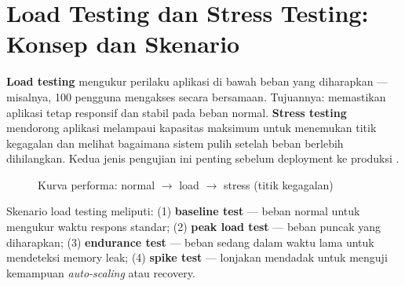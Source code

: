 ﻿\section{Load Testing dan Stress Testing: Konsep dan Skenario}

\textbf{Load testing} mengukur perilaku aplikasi di bawah beban yang diharapkan --- misalnya, 100 pengguna mengakses secara bersamaan. Tujuannya: memastikan aplikasi tetap responsif dan stabil pada beban normal. \textbf{Stress testing} mendorong aplikasi melampaui kapasitas maksimum untuk menemukan titik kegagalan dan melihat bagaimana sistem pulih setelah beban berlebih dihilangkan. Kedua jenis pengujian ini penting sebelum deployment ke produksi \cite{mdnToolsTesting}.

\begin{figure}[H]
\centering
{}
\caption{Kurva performa: normal $\to$ load $\to$ stress (titik kegagalan)}
\end{figure}

Skenario load testing meliputi: (1) \textbf{baseline test} --- beban normal untuk mengukur waktu respons standar; (2) \textbf{peak load test} --- beban puncak yang diharapkan; (3) \textbf{endurance test} --- beban sedang dalam waktu lama untuk mendeteksi memory leak; (4) \textbf{spike test} --- lonjakan mendadak untuk menguji kemampuan \textit{auto-scaling} atau recovery.

